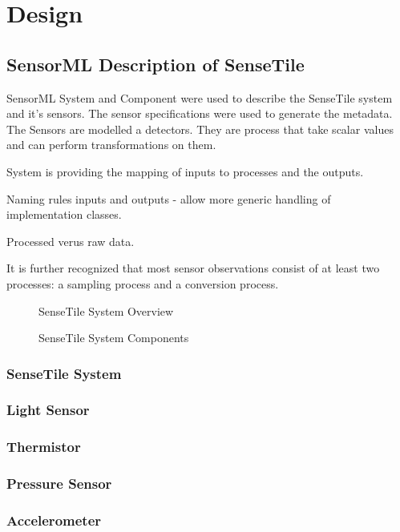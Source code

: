 \documentclass[]{final_report}
\begin{document}
\chapter{Design}
\section{SensorML Description of SenseTile}

SensorML System and Component were used to describe the SenseTile system and it's sensors. The sensor specifications were used to generate the metadata.
The Sensors are modelled a detectors. They are process that take scalar values
and can perform transformations on them.

System is providing the mapping of inputs to processes and the outputs.

Naming rules inputs and outputs - allow more generic handling of implementation classes.

Processed verus raw data.

It is further recognized that most sensor observations consist of at least two processes: a sampling process and a conversion process.

 \begin{figure}
\caption{SenseTile System Overview}\label{fig:SenseTileSystem.pdf}
\end{figure}

 \begin{figure}
\caption{SenseTile System Components}\label{fig:SensorML_SenseTile_System_2_pa1.pdf}
\end{figure}

\subsection{SenseTile System}
\subsection{Light Sensor}
\subsection{Thermistor}
\subsection{Pressure Sensor}
\subsection{Accelerometer}
\end{document}

